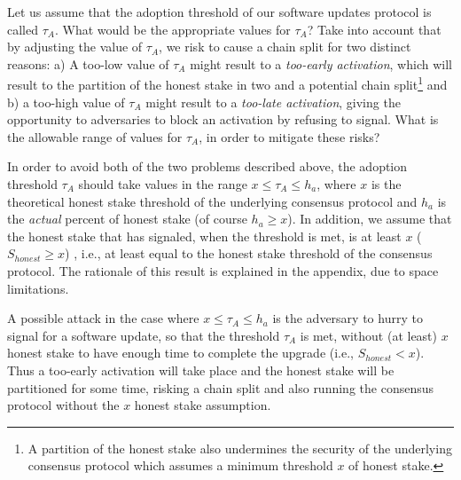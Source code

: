 Let us assume that the adoption threshold of our software updates protocol is called $\tau_A$. %
What would be the appropriate values for $\tau_A$? Take into account that by adjusting the value of $\tau_A$, we risk to cause a chain split for two distinct reasons: a) A too-low value of $\tau_A$ might result to a \emph{too-early activation}, which will result to the partition of the honest stake in two and a potential chain split\footnote{A partition of the honest stake also undermines the security of the underlying consensus protocol which assumes a minimum threshold $x$ of honest stake.}  and b) a too-high value of $\tau_A$ might result to a \emph{too-late activation}, giving the opportunity to adversaries to block an activation by refusing to signal. %
What is the allowable range of values for $\tau_A$, in order to mitigate these risks?

In order to avoid both of the two problems described above, the adoption threshold $\tau_A$ should take values in the range $x \leq \tau_A \leq h_a$, where $x$ is the theoretical honest stake threshold of the underlying consensus protocol and $h_a$ is the \emph{actual} percent of honest stake (of course $h_a \geq x$). In addition, we assume that the honest stake that has signaled, when the threshold is met, is at least $x$ ($S_{honest} \geq x$) , i.e., at least equal to the honest stake threshold of the consensus protocol. The rationale of this result is explained in the appendix, due to space limitations.

A possible attack in the case where $x \leq \tau_A \leq h_a$ is the adversary to hurry to signal for a software update, so that the threshold $\tau_A$ is met, without (at least) $x$ honest stake to have enough time to complete the upgrade (i.e., $S_{honest} < x$). Thus a too-early activation will take place and the honest stake will be partitioned for some time, risking a chain split and also running the consensus protocol without the $x$ honest stake assumption.


